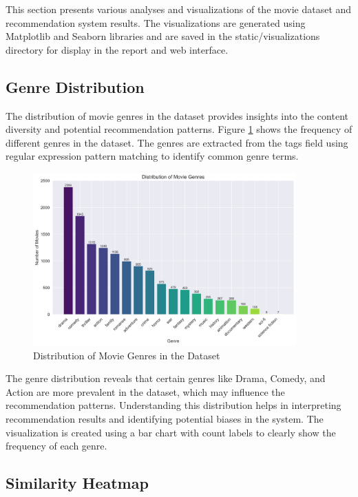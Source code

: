 \documentclass[12pt,a4paper]{article}
\begin{document}
This section presents various analyses and visualizations of the movie dataset and recommendation system results. The visualizations are generated using Matplotlib and Seaborn libraries and are saved in the static/visualizations directory for display in the report and web interface.

\subsection{Genre Distribution}

The distribution of movie genres in the dataset provides insights into the content diversity and potential recommendation patterns. Figure \ref{fig:genre_distribution} shows the frequency of different genres in the dataset. The genres are extracted from the tags field using regular expression pattern matching to identify common genre terms.

\begin{figure}[H]
    \centering
    \includegraphics[width=0.9\textwidth]{static/visualizations/genre_distribution.png}
    \caption{Distribution of Movie Genres in the Dataset}
    \label{fig:genre_distribution}
\end{figure}

The genre distribution reveals that certain genres like Drama, Comedy, and Action are more prevalent in the dataset, which may influence the recommendation patterns. Understanding this distribution helps in interpreting recommendation results and identifying potential biases in the system. The visualization is created using a bar chart with count labels to clearly show the frequency of each genre.

\subsection{Similarity Heatmap}
\end{document}
